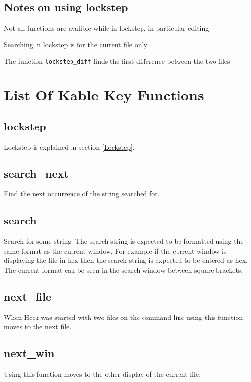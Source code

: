 \documentclass[12pt]{article}
\begin{document}
\subsection{Notes on using lockstep}
\begin{list}{-}{}
\item Not all functions are avalible while in lockstep, in particular editing
\item Searching in lockstep is for the current file only
\item The function \verb#lockstep_diff# finds the first difference between the two files
\end{list}

\section{List Of Kable Key Functions}
\label{List Of Kable Key Functions}

\subsection{lockstep}
Lockstep is explained in section \ref{Lockstep}.

\subsection{search\_next}
Find the next occurrence of the string searched for.

\subsection{search}
Search for some string.  The search string is expected to be formatted using the
same format as the current window.  For example if the current window is 
displaying the file in hex then the search string is expected to be entered as
hex.  The current format can be seen in the search window between square 
brackets.

\subsection{next\_file}
When Heck was started with two files on the command line using this function
moves to the next file.

\subsection{next\_win}
Using this function moves to the other display of the current file.
\end{document}
